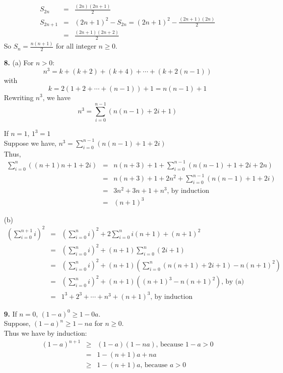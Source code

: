 \documentclass[a4paper,12pt]{article}
\begin{document}
\begin{eqnarray*}
S_{2n} & = & \frac{(2n)(2n+1)}{2}\\
S_{2n+1} & = & (2n+1)^2 - S_{2n} = (2n+1)^2 - \frac{(2n+1)(2n)}{2}\\
& = & \frac{(2n+1)(2n+2)}{2}
\end{eqnarray*}
So $S_n = \frac{n(n+1)}{2}$ for all integer $n \ge 0$.

\bigskip
\noindent
\textbf{8.} (a) For $n > 0$:
\[n^3 = k + (k+2) + (k+4) + \cdots + (k + 2(n-1)) \] with
\[k = 2 (1 + 2 + \cdots + (n-1)) + 1 = n(n-1) + 1 \]
Rewriting $n^3$, we have
\[n^3 = \sum_{i = 0}^{n-1}(n(n-1) + 2 i + 1) \]

\medskip
\noindent
If $n = 1$, $1^3 = 1$\\
Suppose we have, $n^3 = \sum_{i = 0}^{n-1}(n(n-1)+1+2i)$\\
Thus,
\begin{eqnarray*}
\sum_{i=0}^n((n+1)n+1+2i) & = &
n(n+3)+1 + \sum_{i=0}^{n-1}(n(n-1)+1+2i + 2n) \\ & = &
n(n+3)+1 + 2n^2 + \sum_{i=0}^{n-1}(n(n-1)+1+2i) \\ & = &
3n^2 + 3n + 1 + n^3\mbox{, by induction}\\ & = &
(n+1)^3
\end{eqnarray*}

\medskip
\noindent
(b)
\begin{eqnarray*}
(\sum_{i=0}^{n+1}i)^2 & = &
(\sum_{i=0}^ni)^2 + 2\sum_{i=0}^ni(n+1) + (n+1)^2 \\ & = &
(\sum_{i=0}^ni)^2 + (n+1) \sum_{i=0}^n(2i+1) \\ & = &
(\sum_{i=0}^ni)^2 + (n+1) (\sum_{i=0}^n (n(n+1)+2i+1) - n(n+1)^2) \\ & = &
(\sum_{i=0}^ni)^2 + (n+1) ((n+1)^3 - n(n+1)^2)\mbox{, by (a)} \\ & = &
1^3 + 2^3 + \cdots + n^3 + (n+1)^3\mbox{, by induction}
\end{eqnarray*}

\bigskip
\noindent
\textbf{9.} If $n = 0$, $(1 - a)^0 \ge 1 - 0 a$.\\
Suppose, $(1 - a)^n \ge 1 - na$ for $n \ge 0$.\\
Thus we have by induction:
\begin{eqnarray*}
(1-a)^{n+1} & \ge & (1-a)(1-na)\mbox{, because } 1-a > 0\\
& = & 1 - (n+1)a + na\\
& \ge & 1 - (n+1)a\mbox{, because } a > 0
\end{eqnarray*}
\end{document}
